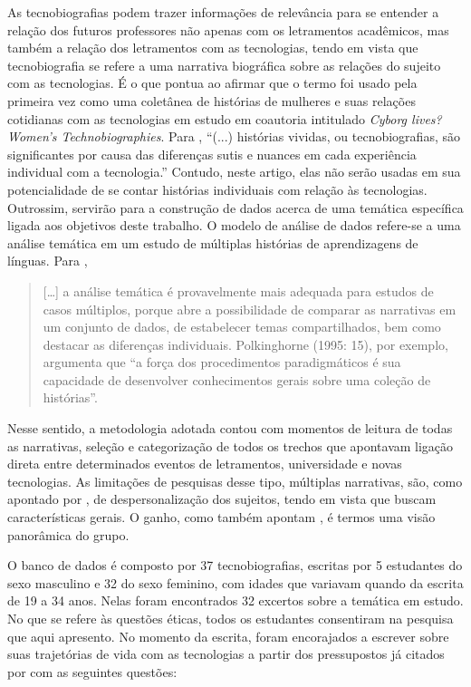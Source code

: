 \documentclass{textolivre}
\begin{document}
As tecnobiografias podem trazer informações de relevância para se entender a relação dos futuros professores não apenas com os letramentos acadêmicos, mas também a relação dos letramentos com as tecnologias, tendo em vista que tecnobiografia se refere a uma narrativa biográfica sobre as relações do sujeito com as tecnologias. É o que pontua \textcite{kennedy_technobiography:_2003} ao afirmar que o termo foi usado pela primeira vez como uma coletânea de histórias de mulheres e suas relações cotidianas com as tecnologias em estudo em coautoria intitulado \textit{Cyborg lives? Women’s Technobiographies}. Para \textcite[p. 120]{kennedy_technobiography:_2003}, “(...) histórias vividas, ou tecnobiografias, são significantes por causa das diferenças sutis e nuances em cada experiência individual com a tecnologia.” Contudo, neste artigo, elas não serão usadas em sua potencialidade de se contar histórias individuais com relação às tecnologias. Outrossim, servirão para a construção de dados acerca de uma temática específica ligada aos objetivos deste trabalho. O modelo de análise de dados refere-se a uma análise temática em um estudo de múltiplas histórias de aprendizagens de línguas. Para \textcite[p. 77]{barkhuizen_narrative_2014},

\begin{quote}
    [\ldots] a análise temática é provavelmente mais adequada para estudos de casos múltiplos, porque abre a possibilidade de comparar as narrativas em um conjunto de dados, de estabelecer temas compartilhados, bem como destacar as diferenças individuais. Polkinghorne (1995: 15), por exemplo, argumenta que “a força dos procedimentos paradigmáticos é sua capacidade de desenvolver conhecimentos gerais sobre uma coleção de histórias”.
\end{quote}

Nesse sentido, a metodologia adotada contou com momentos de leitura de todas as narrativas, seleção e categorização de todos os trechos que apontavam ligação direta entre determinados eventos de letramentos, universidade e novas tecnologias. As limitações de pesquisas desse tipo, múltiplas narrativas, são, como apontado por \textcite{barkhuizen_narrative_2014}, de despersonalização dos sujeitos, tendo em vista que buscam características gerais. O ganho, como também apontam \textcite{barkhuizen_narrative_2014}, é termos uma visão panorâmica do grupo.

O banco de dados é composto por 37 tecnobiografias, escritas por 5 estudantes do sexo masculino e 32 do sexo feminino, com idades que variavam quando da escrita de 19 a 34 anos. Nelas foram encontrados 32 excertos sobre a temática em estudo. No que se refere às questões éticas, todos os estudantes consentiram na pesquisa que aqui apresento. No momento da escrita, foram encorajados a escrever sobre suas trajetórias de vida com as tecnologias a partir dos pressupostos já citados por  com as seguintes questões:
\end{document}
